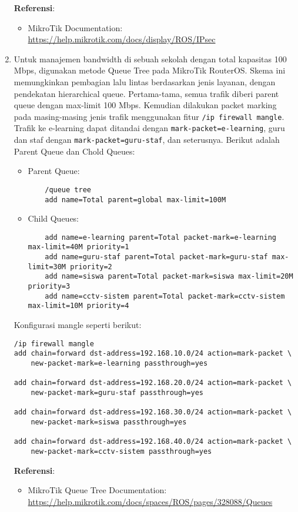 \begin{enumerate}
	\textbf{Referensi}:
	\begin{itemize}
		\item MikroTik Documentation: \url{https://help.mikrotik.com/docs/display/ROS/IPsec}
\end{itemize}
	\item Untuk manajemen bandwidth di sebuah sekolah dengan total kapasitas 100 Mbps, digunakan 
	metode Queue Tree pada MikroTik RouterOS. Skema ini memungkinkan pembagian lalu lintas 
	berdasarkan jenis layanan, dengan pendekatan hierarchical queue. Pertama-tama, semua trafik 
	diberi parent queue dengan max-limit 100 Mbps. Kemudian dilakukan packet marking 
	pada masing-masing jenis trafik menggunakan fitur \texttt{/ip firewall mangle}. Trafik 
	ke e-learning dapat ditandai dengan \texttt{mark-packet=e-learning}, guru dan staf dengan 
	\texttt{mark-packet=guru-staf}, dan seterusnya. Berikut adalah Parent Queue dan Chold Queues:

\begin{itemize}
    \item Parent Queue:
    \begin{verbatim}
    /queue tree
    add name=Total parent=global max-limit=100M
    \end{verbatim}

    \item Child Queues:
    \begin{verbatim}
    add name=e-learning parent=Total packet-mark=e-learning max-limit=40M priority=1
    add name=guru-staf parent=Total packet-mark=guru-staf max-limit=30M priority=2
    add name=siswa parent=Total packet-mark=siswa max-limit=20M priority=3
    add name=cctv-sistem parent=Total packet-mark=cctv-sistem max-limit=10M priority=4
    \end{verbatim}
\end{itemize}

Konfigurasi mangle seperti berikut:
\begin{verbatim}
/ip firewall mangle
add chain=forward dst-address=192.168.10.0/24 action=mark-packet \
    new-packet-mark=e-learning passthrough=yes

add chain=forward dst-address=192.168.20.0/24 action=mark-packet \
    new-packet-mark=guru-staf passthrough=yes

add chain=forward dst-address=192.168.30.0/24 action=mark-packet \
    new-packet-mark=siswa passthrough=yes

add chain=forward dst-address=192.168.40.0/24 action=mark-packet \
    new-packet-mark=cctv-sistem passthrough=yes
\end{verbatim}


\textbf{Referensi}:
\begin{itemize}
    \item MikroTik Queue Tree Documentation: \url{https://help.mikrotik.com/docs/spaces/ROS/pages/328088/Queues}
\end{itemize}

\end{enumerate}

